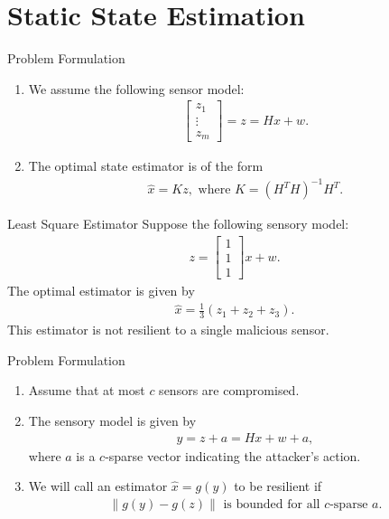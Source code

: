 \documentclass[10pt]{beamer}
\begin{document}
\section{Static State Estimation}

\begin{frame}{Problem Formulation}
  \begin{enumerate}
    \item We assume the following sensor model:
      \begin{align*}
	\begin{bmatrix}z_1\\\vdots\\z_m\end{bmatrix} =  z = Hx + w.
      \end{align*}
    \item The optimal state estimator is of the form
      \begin{align*}
	\hat x = Kz, \text{ where }K = (H^TH)^{-1}H^T.
      \end{align*}
  \end{enumerate}
\end{frame}

\begin{frame}{Least Square Estimator}
  Suppose the following sensory model:
  \begin{align*}
    z = \begin{bmatrix}
      1\\
      1\\
      1
    \end{bmatrix}x + w.
  \end{align*}
  The optimal estimator is given by
  \begin{align*}
    \hat x = \frac{1}{3}\left(z_1+z_2+z_3\right).
  \end{align*}
  This estimator is not resilient to a single malicious sensor.
\end{frame}

\begin{frame}{Problem Formulation}
  \begin{enumerate}
    \item Assume that at most $c$ sensors are compromised.
    \item The sensory model is given by
      \begin{align*}
	y = z + a = Hx + w +a,
      \end{align*}
      where $a$ is a $c$-sparse vector indicating the attacker's action.
    \item We will call an estimator $\hat x = g(y)$ to be resilient if
      \begin{align*}
	\|g(y) - g(z)\|\text{ is bounded for all $c$-sparse $a$}.
      \end{align*}
  \end{enumerate}
\end{frame}
\end{document}
